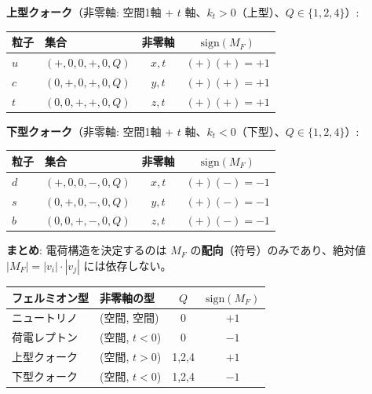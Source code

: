 \documentclass[
  a4paper,11pt]{ltjsarticle}
\newcounter{none} %
\begin{document}
\textbf{上型クォーク}（非零軸: 空間1軸 + \(t\)
軸、\(k_t > 0\)（上型）、\(Q \in \{1, 2, 4\}\)）:

{\def\LTcaptype{none} %
\begin{longtable}[]{@{}llcc@{}}
\toprule\noalign{}
粒子 & 集合 & 非零軸 & \(\text{sign}(M_F)\) \\
\midrule\noalign{}
\endhead
\bottomrule\noalign{}
\endlastfoot
\(u\) & \((+, 0, 0, +, 0, Q)\) & \(x, t\) & \((+)(+)= +1\) \\
\(c\) & \((0, +, 0, +, 0, Q)\) & \(y, t\) & \((+)(+)= +1\) \\
\(t\) & \((0, 0, +, +, 0, Q)\) & \(z, t\) & \((+)(+)= +1\) \\
\end{longtable}
}

\textbf{下型クォーク}（非零軸: 空間1軸 + \(t\)
軸、\(k_t < 0\)（下型）、\(Q \in \{1, 2, 4\}\)）:

{\def\LTcaptype{none} %
\begin{longtable}[]{@{}llcc@{}}
\toprule\noalign{}
粒子 & 集合 & 非零軸 & \(\text{sign}(M_F)\) \\
\midrule\noalign{}
\endhead
\bottomrule\noalign{}
\endlastfoot
\(d\) & \((+, 0, 0, -, 0, Q)\) & \(x, t\) & \((+)(-)= -1\) \\
\(s\) & \((0, +, 0, -, 0, Q)\) & \(y, t\) & \((+)(-)= -1\) \\
\(b\) & \((0, 0, +, -, 0, Q)\) & \(z, t\) & \((+)(-)= -1\) \\
\end{longtable}
}

\textbf{まとめ}: 電荷構造を決定するのは \(M_F\)
の\textbf{配向}（符号）のみであり、絶対値 \(|M_F| = |v_i| \cdot |v_j|\)
には依存しない。

{\def\LTcaptype{none} %
\begin{longtable}[]{@{}llcc@{}}
\toprule\noalign{}
フェルミオン型 & 非零軸の型 & \(Q\) & \(\text{sign}(M_F)\) \\
\midrule\noalign{}
\endhead
\bottomrule\noalign{}
\endlastfoot
ニュートリノ & (空間, 空間) & 0 & \(+1\) \\
荷電レプトン & (空間, \(t<0\)) & 0 & \(-1\) \\
上型クォーク & (空間, \(t>0\)) & 1,2,4 & \(+1\) \\
下型クォーク & (空間, \(t<0\)) & 1,2,4 & \(-1\) \\
\end{longtable}
}
\end{document}
